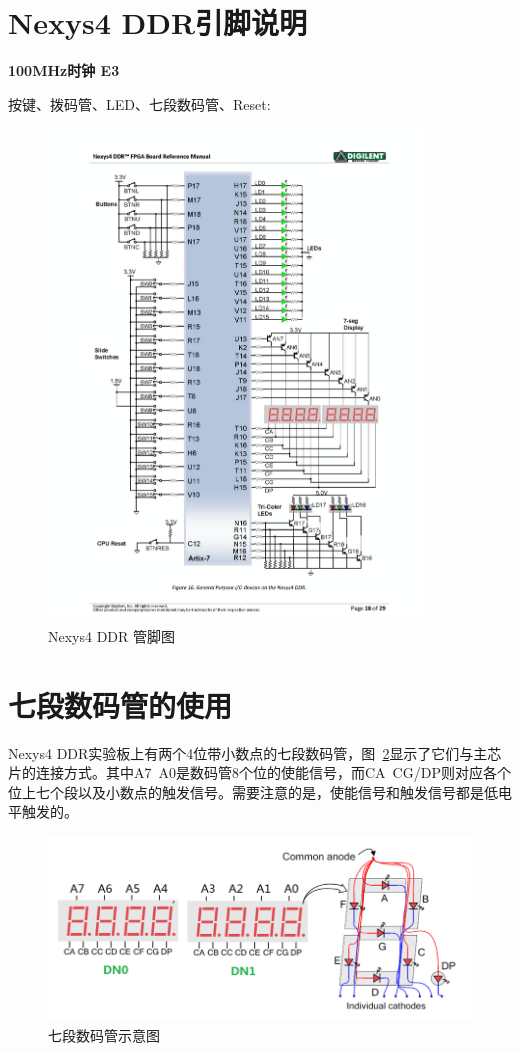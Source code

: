 \newpage
\section{Nexys4 DDR引脚说明}
\textbf{100MHz时钟  E3}

按键、拨码管、LED、七段数码管、Reset:
\begin{figure}[htbp]
    \centering
    \includegraphics[width  = 0.9\textwidth]{image/appendix/appendix_b_0.png}
    \caption{Nexys4 DDR 管脚图}
    \label{fig:my_label}
\end{figure}

\newpage
\section{七段数码管的使用}
Nexys4 DDR实验板上有两个4位带小数点的七段数码管，图~\ref{fig:appendix_c_0}显示了它们与主芯片的连接方式。其中A7~A0是数码管8个位的使能信号，而CA~CG/DP则对应各个位上七个段以及小数点的触发信号。需要注意的是，使能信号和触发信号都是低电平触发的。

\begin{figure}[htbp]
    \centering
    \includegraphics[width = \textwidth]{image/appendix/appendix_c_0.png}
    \caption{七段数码管示意图}
    \label{fig:appendix_c_0}
\end{figure}

